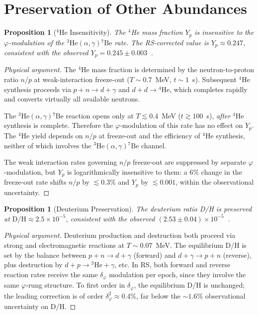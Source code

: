 \documentclass[12pt,a4paper]{article}
\newtheorem{proposition}[theorem]{Proposition}
\theoremstyle{definition}
\theoremstyle{remark}
\begin{document}
\section{Preservation of Other Abundances}
\label{sec:preserve}

\begin{proposition}[$^4$He Insensitivity]
\label{prop:helium}
The $^4$He mass fraction $Y_p$ is insensitive to the $\varphi$-modulation
of the ${}^3\mathrm{He}(\alpha,\gamma){}^7\mathrm{Be}$ rate.  The
RS-corrected value is $Y_p \approx 0.247$, consistent with the observed
$Y_p = 0.245 \pm 0.003$~\cite{Aver2015}.
\end{proposition}

\begin{proof}[Physical argument]
The $^4$He mass fraction is determined by the neutron-to-proton ratio
$n/p$ at weak-interaction freeze-out ($T \sim 0.7$~MeV, $t \sim 1$~s).
Subsequent $^4$He synthesis proceeds via
$p + n \to d + \gamma$ and $d + d \to {}^4\mathrm{He}$, which
completes rapidly and converts virtually all available neutrons.

The ${}^3\mathrm{He}(\alpha,\gamma){}^7\mathrm{Be}$ reaction opens
only at $T \lesssim 0.4$~MeV ($t \gtrsim 100$~s), \emph{after}
$^4$He synthesis is complete.  Therefore the $\varphi$-modulation of
this rate has no effect on $Y_p$.  The $^4$He yield depends on $n/p$
at freeze-out and the efficiency of $^4$He synthesis, neither of
which involves the ${}^3\mathrm{He}(\alpha,\gamma){}^7\mathrm{Be}$
channel.

The weak interaction rates governing $n/p$ freeze-out are suppressed
by separate $\varphi$-modulation, but $Y_p$ is logarithmically
insensitive to them: a $6\%$ change in the freeze-out rate shifts
$n/p$ by $\lesssim 0.3\%$ and $Y_p$ by $\lesssim 0.001$, within
the observational uncertainty.
\end{proof}

\begin{proposition}[Deuterium Preservation]
\label{prop:deuterium}
The deuterium ratio D/H is preserved at $\mathrm{D/H} \approx
2.5 \times 10^{-5}$, consistent with the observed
$(2.53 \pm 0.04) \times 10^{-5}$~\cite{Cooke2018}.
\end{proposition}

\begin{proof}[Physical argument]
Deuterium production and destruction both proceed via strong and
electromagnetic reactions at $T \sim 0.07$~MeV.  The equilibrium D/H
is set by the balance between $p + n \to d + \gamma$ (forward) and
$d + \gamma \to p + n$ (reverse), plus destruction by
$d + p \to {}^3\mathrm{He} + \gamma$, etc.  In RS, both forward and
reverse reaction rates receive the same $\delta_\varphi$ modulation per
epoch, since they involve the same $\varphi$-rung structure.  To first
order in $\delta_\varphi$, the equilibrium D/H is unchanged; the leading
correction is of order $\delta_\varphi^2 \approx 0.4\%$, far below the
$\sim 1.6\%$ observational uncertainty on D/H.
\end{proof}
\end{document}
